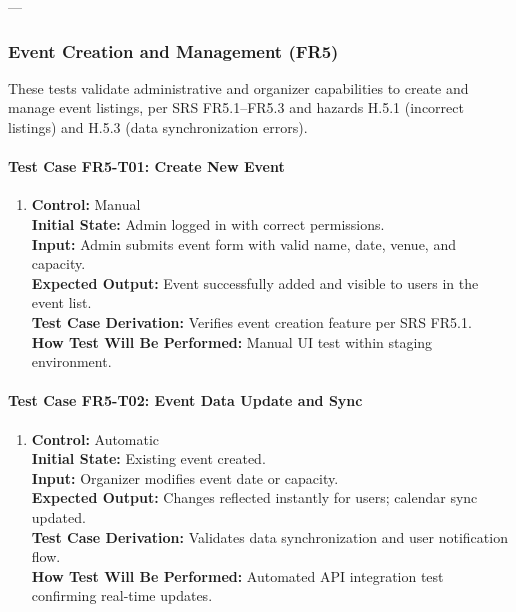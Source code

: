 \documentclass[12pt, titlepage]{article}
\begin{document}
---

\subsubsection{Event Creation and Management (FR5)}

These tests validate administrative and organizer capabilities to create and manage event listings,
per SRS FR5.1–FR5.3 and hazards H.5.1 (incorrect listings) and H.5.3 (data synchronization errors).

\paragraph{Test Case FR5-T01: Create New Event}

\begin{enumerate}
    \item \textbf{Control:} Manual\\
    \textbf{Initial State:} Admin logged in with correct permissions.\\
    \textbf{Input:} Admin submits event form with valid name, date, venue, and capacity.\\
    \textbf{Expected Output:} Event successfully added and visible to users in the event list.\\
    \textbf{Test Case Derivation:} Verifies event creation feature per SRS FR5.1.\\
    \textbf{How Test Will Be Performed:} Manual UI test within staging environment.
\end{enumerate}

\paragraph{Test Case FR5-T02: Event Data Update and Sync}

\begin{enumerate}
    \item \textbf{Control:} Automatic\\
    \textbf{Initial State:} Existing event created.\\
    \textbf{Input:} Organizer modifies event date or capacity.\\
    \textbf{Expected Output:} Changes reflected instantly for users; calendar sync updated.\\
    \textbf{Test Case Derivation:} Validates data synchronization and user notification flow.\\
    \textbf{How Test Will Be Performed:} Automated API integration test confirming real-time updates.
\end{enumerate}
\end{document}
